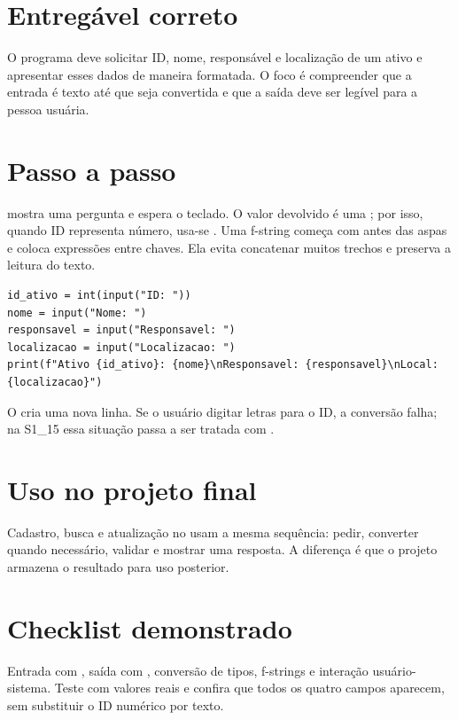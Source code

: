 \documentclass[11pt,a4paper]{article}
\begin{document}
\section*{Entregável correto}
O programa deve solicitar ID, nome, responsável e localização de um ativo e apresentar esses dados de maneira formatada. O foco é compreender que a entrada é texto até que seja convertida e que a saída deve ser legível para a pessoa usuária.
\section*{Passo a passo}
 mostra uma pergunta e espera o teclado. O valor devolvido é uma ; por isso, quando ID representa número, usa-se . Uma f-string começa com  antes das aspas e coloca expressões entre chaves. Ela evita concatenar muitos trechos e preserva a leitura do texto.
\begin{lstlisting}
id_ativo = int(input("ID: "))
nome = input("Nome: ")
responsavel = input("Responsavel: ")
localizacao = input("Localizacao: ")
print(f"Ativo {id_ativo}: {nome}\nResponsavel: {responsavel}\nLocal: {localizacao}")
\end{lstlisting}
O  cria uma nova linha. Se o usuário digitar letras para o ID, a conversão falha; na S1\_15 essa situação passa a ser tratada com .
\section*{Uso no projeto final}
Cadastro, busca e atualização no  usam a mesma sequência: pedir, converter quando necessário, validar e mostrar uma resposta. A diferença é que o projeto armazena o resultado para uso posterior.
\section*{Checklist demonstrado}
Entrada com , saída com , conversão de tipos, f-strings e interação usuário-sistema. Teste com valores reais e confira que todos os quatro campos aparecem, sem substituir o ID numérico por texto.
\end{document}
